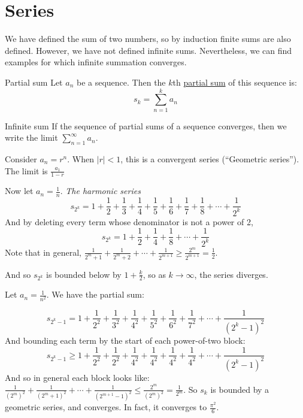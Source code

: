 \documentclass[../Main.tex]{subfiles}
\begin{document}
\section{Series}
We have defined the sum of two numbers, so by induction finite sums are also defined. However, we have not defined infinite sums. Nevertheless, we can find examples for which infinite summation converges.\par
\begin{definition}{Partial sum}
    Let $a_n$ be a sequence. Then the $k$th \underline{partial sum} of this sequence is:
    \begin{equation*}
        s_k = \sum_{n=1}^{k} a_n
    \end{equation*}
\end{definition}
\begin{definition}{Infinite sum}
    If the sequence of partial sums of a sequence converges, then we write the limit $\sum_{n=1}^{\infty} a_n$.
\end{definition}
\begin{examples}{}
    \item Consider $a_n = r^n$. When $|r| < 1$, this is a convergent series (``Geometric series''). The limit is $\frac{a_1}{1-r}$
    \item Now let $a_n = \frac{1}{n}$. \textit{The harmonic series}
        \begin{equation*}
            s_{2^k} = 1 + \frac{1}{2} + \frac{1}{3} + \frac{1}{4} + \frac{1}{5} + \frac{1}{6} + \frac{1}{7} + \frac{1}{8} + \cdots + \frac{1}{2^k}
        \end{equation*}
        And by deleting every term whose denominator is not a power of 2,
        \begin{equation*}
            s_{2^k} = 1 + \frac{1}{2} + \frac{1}{4} + \frac{1}{8} + \cdots + \frac{1}{2^k}
        \end{equation*}
        Note that in general, $\frac{1}{2^m + 1} + \frac{1}{2^m + 2} + \cdots + \frac{1}{2^{m+1}} \geq \frac{2^m}{2^{m+1}} = \frac{1}{2}$.\par
        And so $s_{2^k}$ is bounded below by $1 + \frac{k}{2}$, so as $k \rightarrow \infty$, the series diverges.
    \item Let $a_n = \frac{1}{n^2}$. We have the partial sum:\par
        \begin{equation*}
            s_{2^k - 1} = 1 + \frac{1}{2^2} + \frac{1}{3^2} + \frac{1}{4^2} + \frac{1}{5^2} + \frac{1}{6^2} + \frac{1}{7^2} + \cdots + \frac{1}{(2^k - 1)^2}
        \end{equation*}
        And bounding each term by the start of each power-of-two block:
        \begin{equation*}
            s_{2^k - 1} \geq 1 + \frac{1}{2^2} + \frac{1}{2^2} + \frac{1}{4^2} + \frac{1}{4^2} + \frac{1}{4^2} + \frac{1}{4^2} + \cdots + \frac{1}{(2^k - 1)^2}
        \end{equation*}
        And so in general each block looks like: $\frac{1}{(2^m)^2} + \frac{1}{(2^m + 1)^2} + \cdots + \frac{1}{(2^{m + 1} - 1)^2} \leq \frac{2^m}{(2^m)^2} = \frac{1}{2^m}$.
        So $s_k$ is bounded by a geometric series, and converges. In fact, it converges to $\frac{\pi^2}{6}$.
\end{examples}
\end{document}
